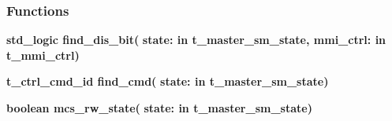 \subsubsection*{Functions}
 \begin{DoxyCompactItemize}
\item 
{\bfseries {\bfseries \textcolor{comment}{std\+\_\+logic}\textcolor{vhdlchar}{ }}} {\bf find\+\_\+dis\+\_\+bit}{\bfseries  ( }{\bfseries \textcolor{vhdlchar}{state\+: }\textcolor{stringliteral}{in }\textcolor{vhdlchar}{t\+\_\+master\+\_\+sm\+\_\+state}}{\bfseries  , \textcolor{vhdlchar}{mmi\+\_\+ctrl\+: }\textcolor{stringliteral}{in }\textcolor{vhdlchar}{t\+\_\+mmi\+\_\+ctrl}}{\bfseries  )} 
\item 
{\bfseries {\bfseries {\bfseries {\bf t\+\_\+ctrl\+\_\+cmd\+\_\+id}} \textcolor{vhdlchar}{ }}} {\bf find\+\_\+cmd}{\bfseries  ( }{\bfseries \textcolor{vhdlchar}{state\+: }\textcolor{stringliteral}{in }\textcolor{vhdlchar}{t\+\_\+master\+\_\+sm\+\_\+state}}{\bfseries  )} 
\item 
{\bfseries {\bfseries \textcolor{comment}{boolean}\textcolor{vhdlchar}{ }}} {\bf mcs\+\_\+rw\+\_\+state}{\bfseries  ( }{\bfseries \textcolor{vhdlchar}{state\+: }\textcolor{stringliteral}{in }\textcolor{vhdlchar}{t\+\_\+master\+\_\+sm\+\_\+state}}{\bfseries  )} 
\end{DoxyCompactItemize}
